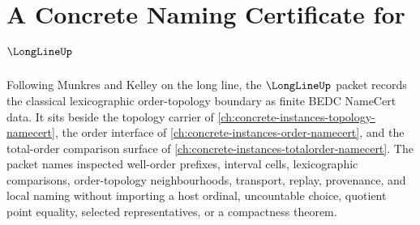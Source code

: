 \chapter{A Concrete Naming Certificate for $\LongLineUp$}
\label{ch:concrete-instances-longline-namecert}

Following Munkres and Kelley on the long line, the $\LongLineUp$ packet records the classical lexicographic order-topology boundary as finite BEDC NameCert data. It sits beside the topology carrier of \autoref{ch:concrete-instances-topology-namecert}, the order interface of \autoref{ch:concrete-instances-order-namecert}, and the total-order comparison surface of \autoref{ch:concrete-instances-totalorder-namecert}. The packet names inspected well-order prefixes, interval cells, lexicographic comparisons, order-topology neighbourhoods, transport, replay, provenance, and local naming without importing a host ordinal, uncountable choice, quotient point equality, selected representatives, or a compactness theorem.

